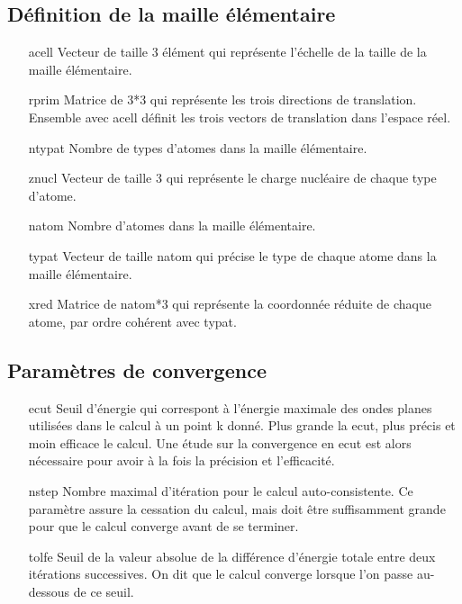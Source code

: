 \subsection{Définition de la maille élémentaire}
\begin{itemize}[labelwidth=, leftmargin=+, font=\bfseries]
  \item[acell] Vecteur de taille 3 élément qui représente l'échelle de la taille de la maille élémentaire.
  \item[rprim] Matrice de 3*3 qui représente les trois directions de translation.
    Ensemble avec acell définit les trois vectors de translation dans l'espace réel.
  \item[ntypat] Nombre de types d'atomes dans la maille élémentaire.
  \item[znucl] Vecteur de taille 3 qui représente le charge nucléaire de chaque type d'atome.
  \item[natom] Nombre d'atomes dans la maille élémentaire.
  \item[typat] Vecteur de taille natom qui précise le type de chaque atome dans la maille élémentaire.
  \item[xred] Matrice de natom*3 qui représente la coordonnée réduite de chaque atome,
    par ordre cohérent avec typat.
\end{itemize}
\subsection{Paramètres de convergence}
\begin{itemize}[labelwidth=, leftmargin=+, font=\bfseries]
  \item[ecut] Seuil d'énergie qui correspont à l'énergie maximale des ondes planes utilisées dans le calcul à un point k donné.
    Plus grande la ecut, plus précis et moin efficace le calcul.
    Une étude sur la convergence en ecut est alors nécessaire pour avoir à la fois la précision et l'efficacité.
  \item[nstep] Nombre maximal d'itération pour le calcul auto-consistente.
    Ce paramètre assure la cessation du calcul, mais doit être suffisamment grande pour que le calcul converge avant de se terminer.
  \item[tolfe] Seuil de la valeur absolue de la différence d'énergie totale entre deux itérations successives.
    On dit que le calcul converge lorsque l'on passe au-dessous de ce seuil.
\end{itemize}



